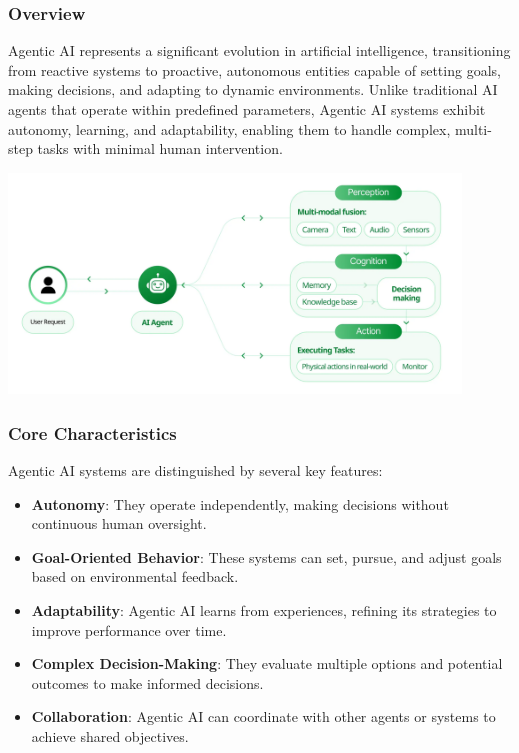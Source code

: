 \subsubsection{Overview}
Agentic AI represents a significant evolution in artificial intelligence, transitioning from reactive systems to proactive, autonomous entities capable of setting goals, making decisions, and adapting to dynamic environments. Unlike traditional AI agents that operate within predefined parameters, Agentic AI systems exhibit autonomy, learning, and adaptability, enabling them to handle complex, multi-step tasks with minimal human intervention.\newpage

\begin{center}
    \centering
    \includegraphics[width=0.9\textwidth]{Images/agentic_ai_architecture.png}
     \cite{agenticAIArchitecture}
    \label{fig:agentic_ai_architecture}
\end{center}

\subsubsection{Core Characteristics}
Agentic AI systems are distinguished by several key features:

\begin{itemize}
    \item \textbf{Autonomy}: They operate independently, making decisions without continuous human oversight.
    \item \textbf{Goal-Oriented Behavior}: These systems can set, pursue, and adjust goals based on environmental feedback.
    \item \textbf{Adaptability}: Agentic AI learns from experiences, refining its strategies to improve performance over time.
    \item \textbf{Complex Decision-Making}: They evaluate multiple options and potential outcomes to make informed decisions.
    \item \textbf{Collaboration}: Agentic AI can coordinate with other agents or systems to achieve shared objectives.
\end{itemize}

